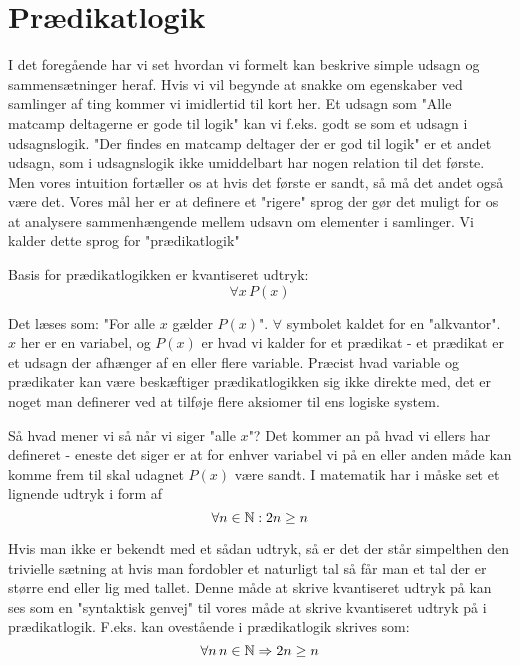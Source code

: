 \ifx\preampleIncluded\undefined
\def\startPraedikatlogik{}


\fi

\section{Prædikatlogik}
I det foregående har vi set hvordan vi formelt kan beskrive simple udsagn og sammensætninger heraf. Hvis vi vil begynde at snakke om egenskaber ved samlinger af ting kommer vi imidlertid til kort her. Et udsagn som "Alle matcamp deltagerne er gode til logik" kan vi f.eks. godt se som et udsagn i udsagnslogik. "Der findes en matcamp deltager der er god til logik" er et andet udsagn, som i udsagnslogik ikke umiddelbart har nogen relation til det første. Men vores intuition fortæller os at hvis det første er sandt, så må det andet også være det. Vores mål her er at definere et "rigere" sprog der gør det muligt for os at analysere sammenhængende mellem udsavn om elementer i samlinger. Vi kalder dette sprog for "prædikatlogik"

Basis for prædikatlogikken er kvantiseret udtryk:
\[
	\forall x \, P(x)
\]

Det læses som: "For alle $x$ gælder $P(x)$". $\forall$ symbolet kaldet for en "alkvantor". $x$ her er en variabel, og $P(x)$ er hvad vi kalder for et prædikat - et prædikat er et udsagn der afhænger af en eller flere variable. Præcist hvad variable og prædikater kan være beskæftiger prædikatlogikken sig ikke direkte med, det er noget man definerer ved at tilføje flere aksiomer til ens logiske system.

Så hvad mener vi så når vi siger "alle $x$"? Det kommer an på hvad vi ellers har defineret - eneste det siger er at for enhver variabel vi på en eller anden måde kan komme frem til skal udagnet $P(x)$ være sandt. I matematik har i måske set et lignende udtryk i form af
\[
	\forall n \in \mathbb{N} : 2n \geq n
\]

Hvis man ikke er bekendt med et sådan udtryk, så er det der står simpelthen den trivielle sætning at hvis man fordobler et naturligt tal så får man et tal der er større end eller lig med tallet. Denne måde at skrive kvantiseret udtryk på kan ses som en "syntaktisk genvej" til vores måde at skrive kvantiseret udtryk på i prædikatlogik. F.eks. kan ovestående i prædikatlogik skrives som: 
\[
	\forall n \, n \in \mathbb{N} \Rightarrow 2n \geq n
\]

